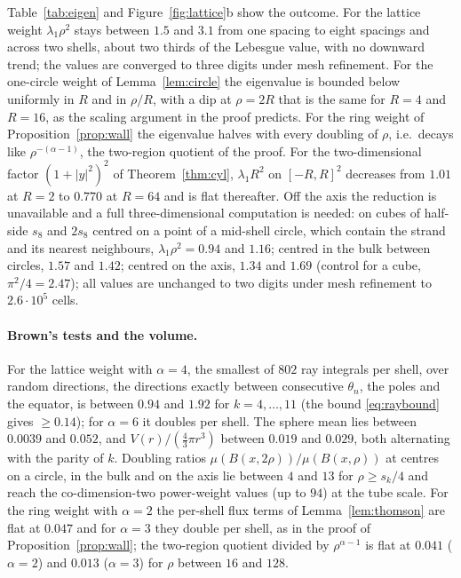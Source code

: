 \documentclass[11pt]{amsart}
\newcommand{\abs}[1]{\lvert #1\rvert}
\theoremstyle{plain}
\theoremstyle{definition}
\theoremstyle{remark}
\begin{document}
Table~\ref{tab:eigen} and Figure~\ref{fig:lattice}b show the outcome. For the
lattice weight $\lambda_1\rho^2$ stays between $1.5$ and $3.1$ from one spacing
to eight spacings and across two shells, about two thirds of the Lebesgue
value, with no downward trend; the values are converged to three digits under
mesh refinement. For the one-circle weight of Lemma~\ref{lem:circle} the
eigenvalue is bounded below uniformly in $R$ and in $\rho/R$, with a dip at
$\rho=2R$ that is the same for $R=4$ and $R=16$, as the scaling argument in the
proof predicts. For the ring weight of Proposition~\ref{prop:wall} the
eigenvalue halves with every doubling of $\rho$, i.e.\ decays like
$\rho^{-(\alpha-1)}$, the two-region quotient of the proof. For the
two-dimensional factor $(1+\abs y^2)^2$ of Theorem~\ref{thm:cyl},
$\lambda_1R^2$ on $[-R,R]^2$ decreases from $1.01$ at $R=2$ to $0.770$ at $R=64$
and is flat thereafter. Off the axis the reduction is unavailable and a full
three-dimensional computation is needed: on cubes of half-side $s_8$ and
$2s_8$ centred on a point of a mid-shell circle, which contain the strand and
its nearest neighbours, $\lambda_1\rho^2=0.94$ and $1.16$; centred in the bulk
between circles, $1.57$ and $1.42$; centred on the axis, $1.34$ and $1.69$
(control for a cube, $\pi^2/4=2.47$); all values are unchanged to two digits
under mesh refinement to $2.6\cdot10^5$ cells.

\paragraph{Brown's tests and the volume.}
For the lattice weight with $\alpha=4$, the smallest of $802$ ray integrals
per shell, over random directions, the directions exactly between consecutive
$\theta_n$, the poles and the equator, is between $0.94$ and $1.92$ for
$k=4,\dots,11$ (the bound \eqref{eq:raybound} gives $\ge0.14$); for $\alpha=6$
it doubles per shell. The sphere mean lies between $0.0039$ and $0.052$, and
$V(r)/(\frac43\pi r^3)$ between $0.019$ and $0.029$, both alternating with the
parity of $k$. Doubling ratios $\mu(B(x,2\rho))/\mu(B(x,\rho))$ at centres on a
circle, in the bulk and on the axis lie between $4$ and $13$ for $\rho\ge s_k/4$
and reach the co-dimension-two power-weight values (up to $94$) at the tube
scale. For the ring weight with $\alpha=2$ the per-shell flux terms of
Lemma~\ref{lem:thomson} are flat at $0.047$ and for $\alpha=3$ they double per
shell, as in the proof of Proposition~\ref{prop:wall}; the two-region quotient
divided by $\rho^{\alpha-1}$ is flat at $0.041$ ($\alpha=2$) and $0.013$
($\alpha=3$) for $\rho$ between $16$ and $128$.
\end{document}
